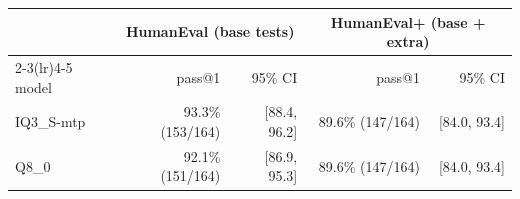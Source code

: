 \begin{tabular}{l rr rr}
\toprule
 & \multicolumn{2}{c}{HumanEval (base tests)} & \multicolumn{2}{c}{HumanEval+ (base + extra)} \\
\cmidrule(lr){2-3}\cmidrule(lr){4-5}
model & pass@1 & 95\% CI & pass@1 & 95\% CI \\
\midrule
IQ3\_S-mtp & 93.3\% (153/164) & [88.4, 96.2] & 89.6\% (147/164) & [84.0, 93.4] \\
Q8\_0 & 92.1\% (151/164) & [86.9, 95.3] & 89.6\% (147/164) & [84.0, 93.4] \\
\bottomrule
\end{tabular}
